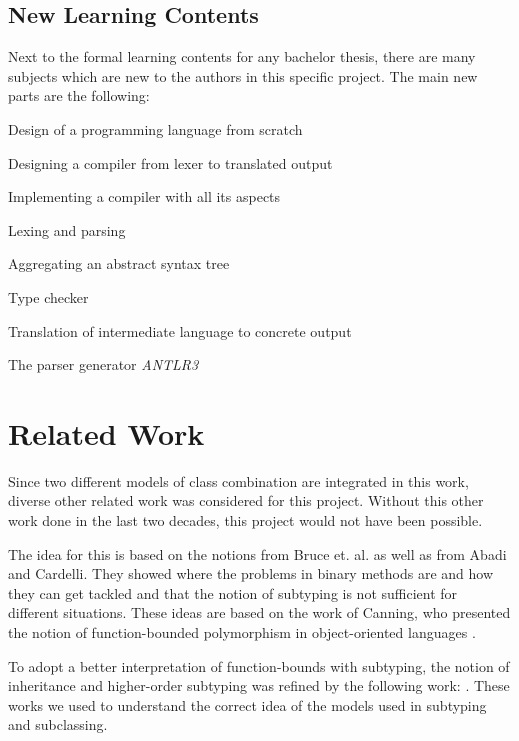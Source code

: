 \subsection{New Learning Contents}
Next to the formal learning contents for any bachelor thesis, there are many
subjects which are new to the authors in this specific project. The main new parts are the following:

\squishlist
	\item Design of a programming language from scratch
	\item Designing a compiler from lexer to translated output
	\item Implementing a compiler with all its aspects
	\squishlist
		\item Lexing and parsing
		\item Aggregating an abstract syntax tree
		\item Type checker
		\item Translation of intermediate language to concrete output
	\squishend
	\item The parser generator \emph{ANTLR3}
\squishend

\section{Related Work}
Since two different models of class combination are integrated in this
work, diverse other related work was considered for this project.
Without this other work done in the last two decades, this project would not
have been possible.

The idea for this is based on the notions from Bruce et. al. as
well as from Abadi and Cardelli.  They showed where the
problems in binary methods are and how they can get tackled
and that the notion of subtyping is not sufficient for different
situations\cite{bruce_binary_1995,abadi_subtyping_1996}. These ideas are
based on the work of Canning, who presented the notion of function-bounded
polymorphism in object-oriented languages \cite{canning_f-bounded_1989}.

To adopt a better interpretation of function-bounds
with subtyping, the notion of inheritance and
higher-order subtyping was refined by the following work:
\cite{steffen_higher-order_1994,cook_inheritance_1990,taivalsaari_notion_1996}.
These works we used to understand the correct idea of the models used
in subtyping and subclassing.

